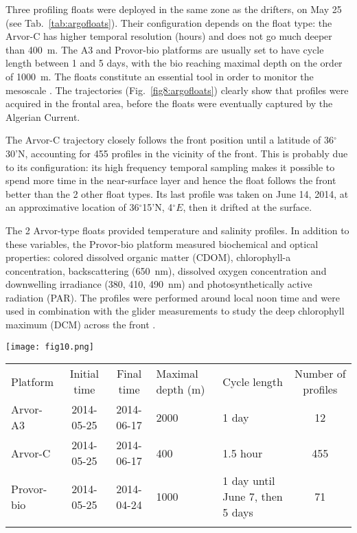 \documentclass[essd,manuscript]{copernicus}
\begin{document}
Three profiling floats were deployed in the same zone as the drifters, on May 25 (see Tab.~\ref{tab:argofloats}). Their configuration depends on the float type: the Arvor-C has higher temporal resolution (hours) and does not go much deeper than 400~m. The A3 and Provor-bio platforms are usually set to have cycle length between 1 and 5 days, with the bio reaching maximal depth on the order of 1000~m. The floats constitute an essential tool in order to monitor the mesoscale \citep{SANCHEZROMAN17}. The trajectories (Fig.~\ref{fig8:argofloats}) clearly show that profiles were acquired in the frontal area, before the floats were eventually captured by the Algerian Current. 

The Arvor-C trajectory closely follows the front position until a latitude of 36$^{\circ}$30'N, accounting for 455 profiles in the vicinity of the front. This is probably due to its configuration: its high frequency temporal sampling makes it possible to spend more time in the near-surface layer and hence the float follows the front better than the 2 other float types. Its last profile was taken on June 14, 2014, at an approximative location of 36$^{\circ}$15'N, 4$^{\circ}E$, then it drifted at the surface.

The 2 Arvor-type floats provided temperature and salinity profiles. In addition to these variables, the Provor-bio platform measured biochemical and optical properties: colored dissolved organic matter (CDOM), chlorophyll-a concentration, backscattering (650~nm), dissolved oxygen concentration and downwelling  irradiance (380, 410, 490~nm) and photosynthetically active radiation (PAR). The profiles were performed around local noon time and were used in combination with the glider measurements to study the deep chlorophyll maximum (DCM) across the front \citep{OLITA17}.

\begin{figure*}[ht]
\texttt{[image: fig10.png]}
\caption{Profiling floats trajectories (top-left panel) and salinity from May 25 to June 15, 2014. \label{fig8:argofloats}}
\end{figure*}


\begin{table*}[htpb]
\caption{Characteristics of the profiling floats.\label{tab:argofloats}}
\begin{tabular}{lccllc}
\tophline
Platform 			& Initial time	& Final time	& Maximal depth (m)		& Cycle length & Number of profiles \\
\middlehline
Arvor-A3			& 2014-05-25	& 2014-06-17	& 2000		& 1 day 	& 12 							\\ 
Arvor-C				& 2014-05-25	& 2014-06-17	& 400		& 1.5 hour	& 455				\\ 
Provor-bio			& 2014-05-25	& 2014-04-24	& 1000		& 1 day until June 7, then 5 days	& 71	\\ 
\bottomhline
\end{tabular}
\end{table*}
\end{document}
